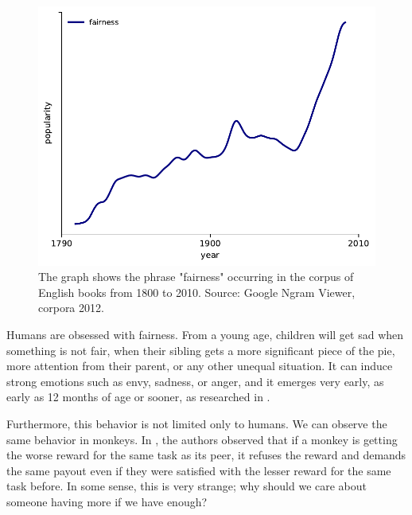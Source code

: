 \begin{figure}[htbp]
    \centering
    \includegraphics{img/google_ngram_fairness-eng_2012-1800-2000.pdf}
    \caption{The graph shows the phrase "fairness" occurring in the corpus of English books from 1800 to 2010. Source: Google Ngram Viewer, corpora 2012. \cite{google_ngram_viewer_2012}}
    \label{fig:popularity_of_fairness}
\end{figure}

Humans are obsessed with fairness. From a young age, children will get sad when something is not fair, when their sibling gets a more significant piece of the pie, more attention from their parent, or any other unequal situation. It can induce strong emotions such as envy, sadness, or anger, and it emerges very early, as early as 12 months of age or sooner, as researched in \cite{children_fairness}.

Furthermore, this behavior is not limited only to humans. We can observe the same behavior in monkeys. In \cite{brosnan2003monkeys}, the authors observed that if a monkey is getting the worse reward for the same task as its peer,  it refuses the reward and demands the same payout even if they were satisfied with the lesser reward for the same task before. In some sense, this is very strange; why should we care about someone having more if we have enough?

